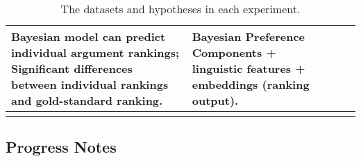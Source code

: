 \begin{table*}
\begin{tabularx}{\textwidth}{ l  X  X  X }
  Bayesian model can predict individual argument rankings;\newline
  Significant differences between individual rankings and gold-standard ranking. &
  Bayesian Preference Components + linguistic features + embeddings (ranking output). \\\hline\\ 
  \end{tabularx}
  \caption{\label{tab:expt_data} The datasets and hypotheses in each experiment.}
\end{table*}

\subsection{Progress Notes}

